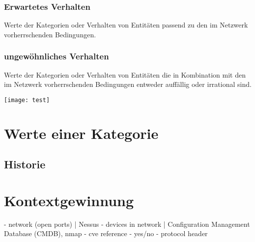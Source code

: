 \subsubsection{Erwartetes Verhalten}
Werte der Kategorien oder Verhalten von Entitäten passend  zu den im Netzwerk vorherrschenden Bedingungen.
\subsubsection{ungewöhnliches Verhalten}
Werte der Kategorien oder Verhalten von Entitäten die in Kombination mit den im Netzwerk vorherrschenden Bedingungen entweder auffällig oder irrational sind.

\newpage
\texttt{[image: test]}
\section{Werte einer Kategorie}

\subsection{Historie}
\section{Kontextgewinnung}
- network (open ports) | Nessus
- devices in network | Configuration Management Database (CMDB), nmap   
- cve reference - yes/no
- protocol header

